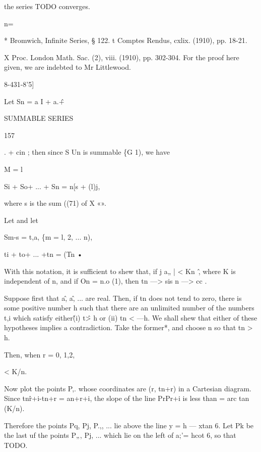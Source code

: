 the series TODO converges. 

n=\ 

* Bromwich, Infinite Series, § 122. 
t Comptes Rendus, cxlix. (1910), pp. 18-21. 

X Proc. London Math. Sac. (2), viii. (1910), pp. 302-304. For the proof here given, we are 
indebted to Mr Littlewood. 



8-431-8'5] 

Let Sn = a I + a.\^ + 



SUMMABLE SERIES 



157 



. + cin ; then since S Un is summable \{G 1), we have 

M = l 

Si + So+ ... + Sn = n[s + (l)j, 



where s is the sum ((71) of X «». 



Let 
and let 



Sm-s = t,a, \{m = l, 2, ... n), 

ti + to+ ... +tn = (Tn • 



With this notation, it is sufficient to shew that, if j a„ | < Kn~\^, where K 
is independent of n, and if On = n.o (1), then tn —> sis n —> cc . 

Suppose first that a\^, a\^, ... are real. Then, if tn does not tend to zero, 
there is some positive number h such that there are an unlimited number of 
the numbers t,i which satisfy either\^ (i) t\^ > h or (ii) tn < —h. We shall shew 
that either of these hypotheses implies a contradiction. Take the former*, 
and choose n so that tn > h. 



Then, when r = 0, 1,2, 



< K/n. 




Now plot the points P,. whose coordinates are (r, tn+r) in a Cartesian 
diagram. Since tn\^r+i-tn+r = an+r+i, the slope of the line PrPr+i is less 
than = arc tan (K/n). 

Therefore the points Pq, Pj, P.,, ... lie above the line y = h — xtan 6. 
Let Pk be the last uf the points P„, Pj, ... which lie on the left of a;'= hcot 6, 
so that TODO. 

